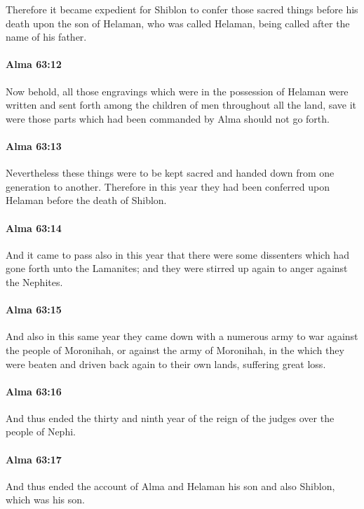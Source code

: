 			Therefore it became expedient
			for Shiblon to confer those sacred things before his death
			upon the son of Helaman, who was called Helaman,
			being called after the name of his father.

		\paragraph{Alma 63:12} %
			\label{ALMA-63-12}

			Now behold, all those engravings which were in the possession of Helaman
			were written and sent forth among the children of men throughout all the land,
			save it were those parts which had been commanded by Alma should not go forth.

		\paragraph{Alma 63:13} %
			\label{ALMA-63-13}

			Nevertheless these things were to be kept sacred
			and handed down from one generation to another.
			Therefore in this year they had been conferred upon Helaman
			before the death of Shiblon.

		\paragraph{Alma 63:14} %
			\label{ALMA-63-14}

			And it came to pass also in this year
			that there were some dissenters which had gone forth unto the Lamanites;
			and they were stirred up again to anger against the Nephites.

		\paragraph{Alma 63:15} %
			\label{ALMA-63-15}

			And also in this same year they came down with a numerous army
			to war against the people of Moronihah, or against the army of Moronihah,
			in the which they were beaten
			and driven back again to their own lands,
			suffering great loss.

		\paragraph{Alma 63:16} %
			\label{ALMA-63-16}

			And thus ended the thirty and ninth year
			of the reign of the judges over the people of Nephi.

		\paragraph{Alma 63:17} %
			\label{ALMA-63-17}

			And thus ended the account of Alma
			and Helaman his son
			and also Shiblon, which was his son.